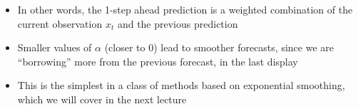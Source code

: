 \documentclass{article}
\begin{document}
\begin{itemize}
\item In other words, the 1-step ahead prediction is a weighted combination of
  the current observation $x_t$ and the previous prediction 

\item Smaller values of $\alpha$ (closer to 0) lead to smoother forecasts, since
  we are ``borrowing'' more from the previous forecast, in the last
  display

\item This is the simplest in a class of methods based on exponential smoothing,
  which we will cover in the next lecture
\end{itemize}
\end{document}
